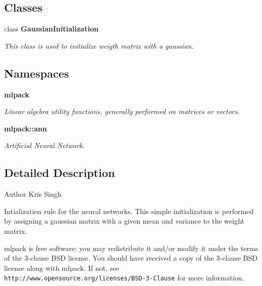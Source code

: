 \subsection*{Classes}
\begin{DoxyCompactItemize}
\item 
class \textbf{ Gaussian\+Initialization}
\begin{DoxyCompactList}\small\item\em This class is used to initialize weigth matrix with a gaussian. \end{DoxyCompactList}\end{DoxyCompactItemize}
\subsection*{Namespaces}
\begin{DoxyCompactItemize}
\item 
 \textbf{ mlpack}
\begin{DoxyCompactList}\small\item\em Linear algebra utility functions, generally performed on matrices or vectors. \end{DoxyCompactList}\item 
 \textbf{ mlpack\+::ann}
\begin{DoxyCompactList}\small\item\em Artificial Neural Network. \end{DoxyCompactList}\end{DoxyCompactItemize}


\subsection{Detailed Description}
\begin{DoxyAuthor}{Author}
Kris Singh
\end{DoxyAuthor}
Intialization rule for the neural networks. This simple initialization is performed by assigning a gaussian matrix with a given mean and variance to the weight matrix.

mlpack is free software; you may redistribute it and/or modify it under the terms of the 3-\/clause B\+SD license. You should have received a copy of the 3-\/clause B\+SD license along with mlpack. If not, see {\tt http\+://www.\+opensource.\+org/licenses/\+B\+S\+D-\/3-\/\+Clause} for more information. 